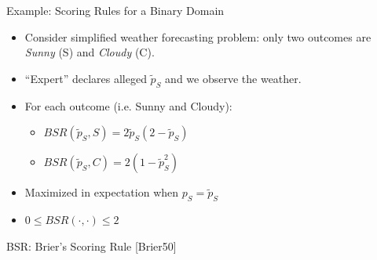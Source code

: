 \begin{frame}{Example: Scoring Rules for a Binary Domain}
	\begin{itemize}[<+- | alert@+>]
		\item Consider simplified weather forecasting problem: only two outcomes are \emph{Sunny} (S) and \emph{Cloudy} (C).
		\item ``Expert'' declares alleged $\tilde{p}_S$ and we observe the weather.
		\item For each outcome (i.e. Sunny and Cloudy):
		\begin{itemize}
			\item $BSR(\tilde{p}_S, S) = 2\tilde{p}_S(2-\tilde{p}_S)$
			\item $BSR(\tilde{p}_S, C) = 2(1-\tilde{p}_S^2)$
		\end{itemize}
		\item Maximized in expectation  when $p_S = \tilde{p}_S$
		\item $0 \leq BSR(\cdot, \cdot) \leq 2$
		
	\end{itemize}
	
	\bigskip
	\bigskip
	
	\small{BSR: Brier's Scoring Rule [Brier50]}
	
\end{frame}

